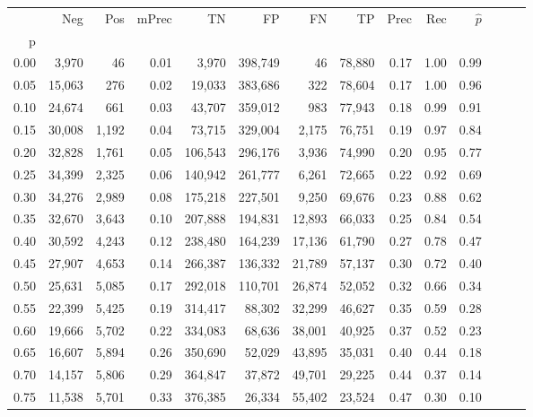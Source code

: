 \begin{tabular}{rrrrrrrrrrrrrr}
\toprule
{} &     Neg &    Pos & mPrec &       TN &       FP &      FN &      TP &  Prec &   Rec & $\hat{p}$ \\
p    &         &        &       &          &          &         &         &       &       &           \\
\midrule
0.00 &   3,970 &     46 &  0.01 &    3,970 &  398,749 &      46 &  78,880 &  0.17 &  1.00 &      0.99 \\
0.05 &  15,063 &    276 &  0.02 &   19,033 &  383,686 &     322 &  78,604 &  0.17 &  1.00 &      0.96 \\
0.10 &  24,674 &    661 &  0.03 &   43,707 &  359,012 &     983 &  77,943 &  0.18 &  0.99 &      0.91 \\
0.15 &  30,008 &  1,192 &  0.04 &   73,715 &  329,004 &   2,175 &  76,751 &  0.19 &  0.97 &      0.84 \\
0.20 &  32,828 &  1,761 &  0.05 &  106,543 &  296,176 &   3,936 &  74,990 &  0.20 &  0.95 &      0.77 \\
0.25 &  34,399 &  2,325 &  0.06 &  140,942 &  261,777 &   6,261 &  72,665 &  0.22 &  0.92 &      0.69 \\
0.30 &  34,276 &  2,989 &  0.08 &  175,218 &  227,501 &   9,250 &  69,676 &  0.23 &  0.88 &      0.62 \\
0.35 &  32,670 &  3,643 &  0.10 &  207,888 &  194,831 &  12,893 &  66,033 &  0.25 &  0.84 &      0.54 \\
0.40 &  30,592 &  4,243 &  0.12 &  238,480 &  164,239 &  17,136 &  61,790 &  0.27 &  0.78 &      0.47 \\
0.45 &  27,907 &  4,653 &  0.14 &  266,387 &  136,332 &  21,789 &  57,137 &  0.30 &  0.72 &      0.40 \\
0.50 &  25,631 &  5,085 &  0.17 &  292,018 &  110,701 &  26,874 &  52,052 &  0.32 &  0.66 &      0.34 \\
0.55 &  22,399 &  5,425 &  0.19 &  314,417 &   88,302 &  32,299 &  46,627 &  0.35 &  0.59 &      0.28 \\
0.60 &  19,666 &  5,702 &  0.22 &  334,083 &   68,636 &  38,001 &  40,925 &  0.37 &  0.52 &      0.23 \\
0.65 &  16,607 &  5,894 &  0.26 &  350,690 &   52,029 &  43,895 &  35,031 &  0.40 &  0.44 &      0.18 \\
0.70 &  14,157 &  5,806 &  0.29 &  364,847 &   37,872 &  49,701 &  29,225 &  0.44 &  0.37 &      0.14 \\
0.75 &  11,538 &  5,701 &  0.33 &  376,385 &   26,334 &  55,402 &  23,524 &  0.47 &  0.30 &      0.10 \\

\end{tabular}

